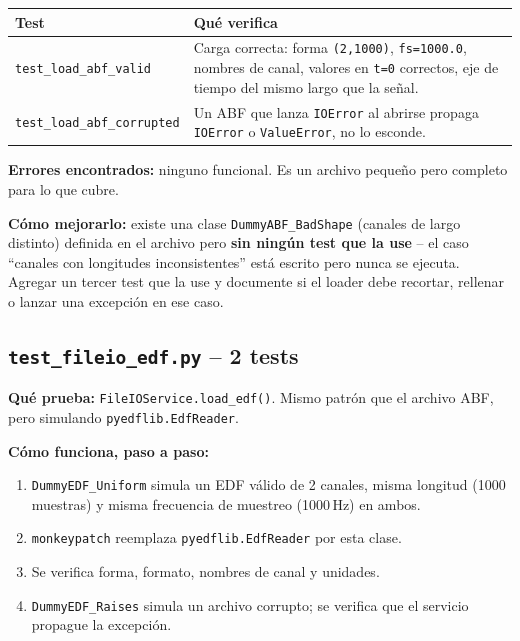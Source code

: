 \documentclass[11pt,a4paper]{article}
\begin{document}
\begin{center}
\begin{longtable}{L{5.5cm}L{9cm}}
\toprule
\textbf{Test} & \textbf{Qué verifica} \\
\midrule
\endhead
\texttt{test\_\allowbreak load\_\allowbreak abf\_\allowbreak valid} & Carga correcta: forma \texttt{(2,1000)}, \texttt{fs=1000.0}, nombres de canal, valores en \texttt{t=0} correctos, eje de tiempo del mismo largo que la señal. \\
\texttt{test\_\allowbreak load\_\allowbreak abf\_\allowbreak corrupted} & Un ABF que lanza \texttt{IOError} al abrirse propaga \texttt{IOError} o \texttt{ValueError}, no lo esconde. \\
\bottomrule
\end{longtable}
\end{center}

\textbf{Errores encontrados:} ninguno funcional. Es un archivo pequeño pero completo para lo que cubre.

\textbf{Cómo mejorarlo:} existe una clase \texttt{DummyABF\_\allowbreak BadShape} (canales de largo distinto) definida
en el archivo pero \textbf{sin ningún test que la use} -- el caso ``canales con longitudes inconsistentes''
está escrito pero nunca se ejecuta. Agregar un tercer test que la use y documente si el loader debe recortar,
rellenar o lanzar una excepción en ese caso.

\subsection{\texttt{test\_\allowbreak fileio\_\allowbreak edf.py} -- 2 tests}

\textbf{Qué prueba:} \texttt{FileIOService.load\_\allowbreak edf()}. Mismo patrón que el archivo ABF, pero simulando
\texttt{pyedflib.EdfReader}.

\textbf{Cómo funciona, paso a paso:}
\begin{enumerate}
  \item \texttt{DummyEDF\_\allowbreak Uniform} simula un EDF válido de 2 canales, misma longitud (1000 muestras) y misma
        frecuencia de muestreo (1000\,Hz) en ambos.
  \item \texttt{monkeypatch} reemplaza \texttt{pyedflib.EdfReader} por esta clase.
  \item Se verifica forma, formato, nombres de canal y unidades.
  \item \texttt{DummyEDF\_\allowbreak Raises} simula un archivo corrupto; se verifica que el servicio propague la
        excepción.
\end{enumerate}
\end{document}
